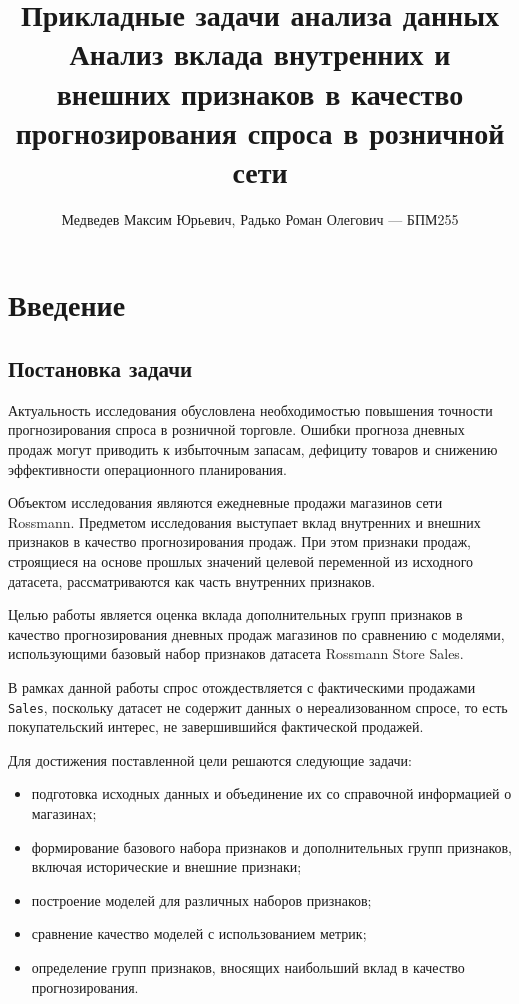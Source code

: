 \documentclass[12pt,a4paper]{article}
\title{\textbf{Прикладные задачи анализа данных}\\[0.3em]\large Анализ вклада внутренних и внешних признаков в качество прогнозирования спроса в розничной сети}
\author{Медведев Максим Юрьевич, Радько Роман Олегович --- БПМ255}
\numberwithin{equation}{section}
\begin{document}
\maketitle
\tableofcontents
\clearpage

\section{Введение}

\subsection{Постановка задачи}

Актуальность исследования обусловлена необходимостью повышения точности прогнозирования спроса в розничной торговле. Ошибки прогноза дневных продаж могут приводить к избыточным запасам, дефициту товаров и снижению эффективности операционного планирования.

Объектом исследования являются ежедневные продажи магазинов сети Rossmann. Предметом исследования выступает вклад внутренних и внешних признаков в качество прогнозирования продаж. При этом признаки продаж, строящиеся на основе прошлых значений целевой переменной из исходного датасета, рассматриваются как часть внутренних признаков.

Целью работы является оценка вклада дополнительных групп признаков в качество прогнозирования дневных продаж магазинов по сравнению с моделями, использующими базовый набор признаков датасета Rossmann Store Sales.

В рамках данной работы спрос отождествляется с фактическими продажами \texttt{Sales}, поскольку датасет не содержит данных о нереализованном спросе, то есть покупательский интерес, не завершившийся фактической продажей.

Для достижения поставленной цели решаются следующие задачи:
\begin{itemize}
    \item подготовка исходных данных и объединение их со справочной информацией о магазинах;
    \item формирование базового набора признаков и дополнительных групп признаков, включая исторические и внешние признаки;
    \item построение моделей для различных наборов признаков;
    \item сравнение качество моделей с использованием метрик;
    \item определение групп признаков, вносящих наибольший вклад в качество прогнозирования.
\end{itemize}
\end{document}
